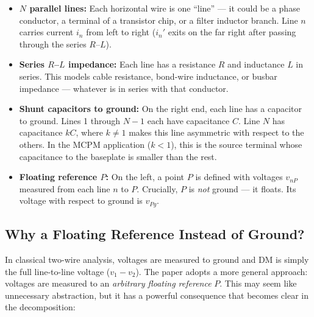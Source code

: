 \begin{circuitbox}
\begin{itemize}
    \item \textbf{$N$ parallel lines:} Each horizontal wire is one
          ``line'' — it could be a phase conductor, a terminal of a
          transistor chip, or a filter inductor branch.  Line $n$
          carries current $i_n$ from left to right ($i_n'$ exits on
          the far right after passing through the series $R$--$L$).

    \item \textbf{Series $R$--$L$ impedance:} Each line has a
          resistance $R$ and inductance $L$ in series.  This models
          cable resistance, bond-wire inductance, or busbar
          impedance — whatever is in series with that conductor.

    \item \textbf{Shunt capacitors to ground:} On the right end,
          each line has a capacitor to ground.  Lines 1 through $N-1$
          each have capacitance $C$.  Line $N$ has capacitance $kC$,
          where $k \neq 1$ makes this line asymmetric with respect to
          the others.  In the MCPM application ($k < 1$), this is the
          source terminal whose capacitance to the baseplate is smaller
          than the rest.

    \item \textbf{Floating reference $P$:} On the left, a point $P$
          is defined with voltages $v_{nP}$ measured from each line $n$
          to $P$.  Crucially, $P$ is \emph{not} ground — it floats.
          Its voltage with respect to ground is $v_{Pg}$.
\end{itemize}
\end{circuitbox}

\subsection{Why a Floating Reference Instead of Ground?}

In classical two-wire analysis, voltages are measured to ground and
DM is simply the full line-to-line voltage ($v_1 - v_2$).  The paper
adopts a more general approach: voltages are measured to an
\emph{arbitrary floating reference} $P$.  This may seem like unnecessary abstraction,
but it has a powerful consequence that becomes clear in the
decomposition:

